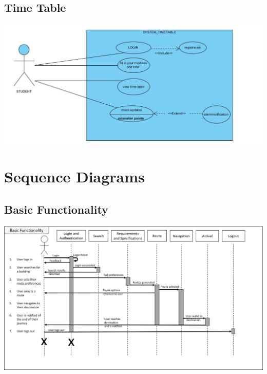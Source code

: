 \documentclass[12pt]{article}
\begin{document}
	

	\subsection{Time Table}

	\includegraphics[width=\linewidth]{timetable.jpg}

	

	

	

	

\section{Sequence Diagrams}

	

	\subsection{Basic Functionality}

	\includegraphics[width=\linewidth]{BasicFunctionality_SequenceDiagram_Schae.jpg}

	
  
\end{document}
